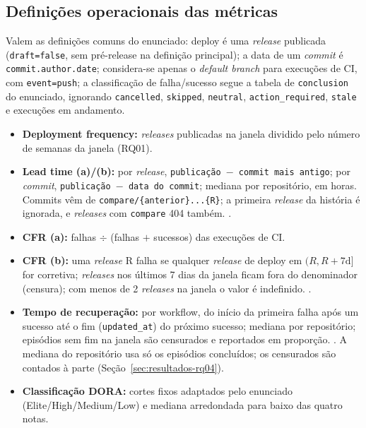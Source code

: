 \subsection{Definições operacionais das métricas}
Valem as definições comuns do enunciado: deploy é uma \textit{release} publicada (\texttt{draft=false},
sem pré-release na definição principal); a data de um \textit{commit} é \texttt{commit.author.date};
considera-se apenas o \textit{default branch} para execuções de CI, com \texttt{event=push}; a
classificação de falha/sucesso segue a tabela de \texttt{conclusion} do enunciado, ignorando
\texttt{cancelled}, \texttt{skipped}, \texttt{neutral}, \texttt{action\_required}, \texttt{stale} e execuções
em andamento.
\begin{itemize}
  \item \textbf{Deployment frequency:} \textit{releases} publicadas na janela dividido pelo número de
  semanas da janela (RQ01).
  \item \textbf{Lead time (a)/(b):} por \textit{release}, \texttt{publicação $-$ commit mais antigo}; por
  \textit{commit}, \texttt{publicação $-$ data do commit}; mediana por repositório, em horas. Commits
  vêm de \texttt{compare/\{anterior\}...\{R\}}; a primeira \textit{release} da história é ignorada, e
  \textit{releases} com \texttt{compare} 404 também. .
  \item \textbf{CFR (a):} falhas $\div$ (falhas $+$ sucessos) das execuções de CI.
  \item \textbf{CFR (b):} uma \textit{release} R falha se qualquer \textit{release} de deploy em
  $(R, R{+}7\text{d}]$ for corretiva; \textit{releases} nos últimos 7 dias da janela ficam fora do
  denominador (censura); com menos de 2 \textit{releases} na janela o valor é indefinido.
  .
  \item \textbf{Tempo de recuperação:} por workflow, do início da primeira falha após um sucesso até o fim
  (\texttt{updated\_at}) do próximo sucesso; mediana por repositório; episódios sem fim na janela são
  censurados e reportados em proporção. . A mediana do repositório usa
  só os episódios concluídos; os censurados são contados à parte (Seção~\ref{sec:resultados-rq04}).
  \item \textbf{Classificação DORA:} cortes fixos adaptados pelo enunciado (Elite/High/Medium/Low) e
  mediana arredondada para baixo das quatro notas.
\end{itemize}
